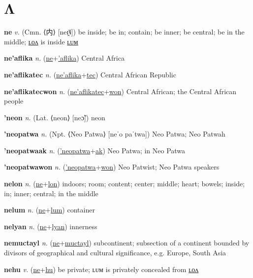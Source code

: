 \section{Λ}

\textbf{\hypertarget{ne}{ne}} \textit{v.} (Cmn. ⟨{\chinese{}内}⟩ [neɪ̯˥˩])
be inside; be in; contain; be inner; be central; be in the middle; \hyperlink{nelon}{ʟᴏᴧ} is inside \hyperlink{nelum}{ʟᴜᴍ}

\textbf{\hypertarget{ne'aflika}{ne'aflika}} \textit{n.} (\hyperlink{ne}{ne}+\allowbreak \hyperlink{'aflika}{'aflika})
Central Africa

\textbf{\hypertarget{ne'aflikatec}{ne'aflikatec}} \textit{n.} (\hyperlink{ne'aflika}{ne'aflika}+\allowbreak \hyperlink{tec}{tec})
Central African Republic

\textbf{\hypertarget{ne'aflikatecwon}{ne'aflikatecwon}} \textit{n.} (\hyperlink{ne'aflikatec}{ne'aflikatec}+\allowbreak \hyperlink{won}{won})
Central African; the Central African people

\textbf{\hypertarget{'neon}{'neon}} \textit{n.} (Lat. ⟨neon⟩ [neɔ̃])
neon

\textbf{\hypertarget{'neopatwa}{'neopatwa}} \textit{n.} (Npt. ⟨Neo Patwa⟩ [neˈo paˈtwa])
Neo Patwa; Neo Patwah

\textbf{\hypertarget{'neopatwaak}{'neopatwaak}} \textit{n.} (\hyperlink{'neopatwa}{'neopatwa}+\allowbreak \hyperlink{ak}{ak})
Neo Patwa; in Neo Patwa

\textbf{\hypertarget{'neopatwawon}{'neopatwawon}} \textit{n.} (\hyperlink{'neopatwa}{'neopatwa}+\allowbreak \hyperlink{won}{won})
Neo Patwist; Neo Patwa speakers

\textbf{\hypertarget{nelon}{nelon}} \textit{n.} (\hyperlink{ne}{ne}+\allowbreak \hyperlink{lon}{lon})
indoors; room; content; center; middle; heart; bowels; inside; in; inner; central; in the middle

\textbf{\hypertarget{nelum}{nelum}} \textit{n.} (\hyperlink{ne}{ne}+\allowbreak \hyperlink{lum}{lum})
container

\textbf{\hypertarget{nelyan}{nelyan}} \textit{n.} (\hyperlink{ne}{ne}+\allowbreak \hyperlink{lyan}{lyan})
innerness

\textbf{\hypertarget{nemuctayl}{nemuctayl}} \textit{n.} (\hyperlink{ne}{ne}+\allowbreak \hyperlink{muctayl}{muctayl})
subcontinent; subsection of a continent bounded by divisors of geographical and cultural significance, e.g. Europe, South Asia

\textbf{\hypertarget{nehu}{nehu}} \textit{v.} (\hyperlink{ne}{ne}+\allowbreak \hyperlink{hu}{hu})
be private; ʟᴜᴍ is privately concealed from \hyperlink{nehulon}{ʟᴏᴧ}

